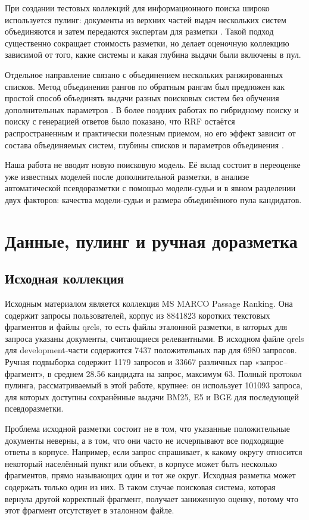 \documentclass[runningheads,a4paper]{llncs}
\begin{document}
При создании тестовых коллекций для информационного поиска широко используется пулинг: документы из верхних частей выдач нескольких систем объединяются и затем передаются экспертам для разметки \cite{voorhees2005trec}. Такой подход существенно сокращает стоимость разметки, но делает оценочную коллекцию зависимой от того, какие системы и какая глубина выдачи были включены в пул.

Отдельное направление связано с объединением нескольких ранжированных списков. Метод объединения рангов по обратным рангам был предложен как простой способ объединять выдачи разных поисковых систем без обучения дополнительных параметров \cite{cormack2009rrf}. В более поздних работах по гибридному поиску и поиску с генерацией ответов было показано, что RRF остаётся распространенным и практически полезным приемом, но его эффект зависит от состава объединяемых систем, глубины списков и параметров объединения \cite{bruch2023fusion,mackenzie2023anserini,rackauckas2024ragfusion}.

Наша работа не вводит новую поисковую модель. Её вклад состоит в переоценке уже известных моделей после дополнительной разметки, в анализе автоматической псевдоразметки с помощью модели-судьи и в явном разделении двух факторов: качества модели-судьи и размера объединённого пула кандидатов.

\section{Данные, пулинг и ручная доразметка}

\subsection{Исходная коллекция}

Исходным материалом является коллекция MS MARCO Passage Ranking. Она содержит запросы пользователей, корпус из 8841823 коротких текстовых фрагментов и файлы qrels, то есть файлы эталонной разметки, в которых для запроса указаны документы, считающиеся релевантными. В исходном файле qrels для development-части содержится 7437 положительных пар для 6980 запросов. Ручная подвыборка содержит 1179 запросов и 33667 различных пар «запрос--фрагмент», в среднем 28.56 кандидата на запрос, максимум 63. Полный протокол пулинга, рассматриваемый в этой работе, крупнее: он использует 101093 запроса, для которых доступны сохранённые выдачи BM25, E5 и BGE для последующей псевдоразметки.

Проблема исходной разметки состоит не в том, что указанные положительные документы неверны, а в том, что они часто не исчерпывают все подходящие ответы в корпусе. Например, если запрос спрашивает, к какому округу относится некоторый населённый пункт или объект, в корпусе может быть несколько фрагментов, прямо называющих один и тот же округ. Исходная разметка может содержать только один из них. В таком случае поисковая система, которая вернула другой корректный фрагмент, получает заниженную оценку, потому что этот фрагмент отсутствует в эталонном файле.
\end{document}
